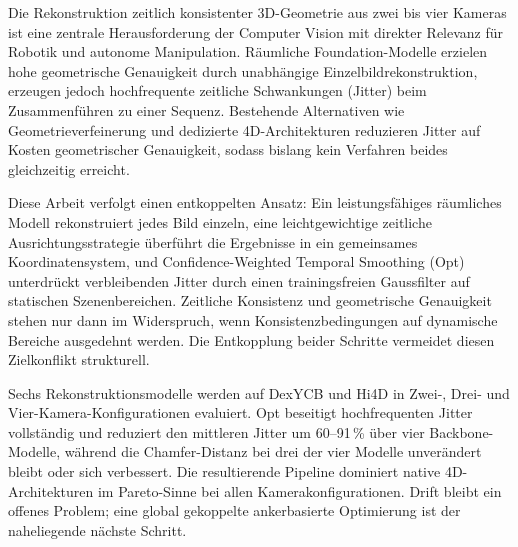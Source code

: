 Die Rekonstruktion zeitlich konsistenter 3D-Geometrie aus zwei bis vier Kameras
ist eine zentrale Herausforderung der Computer Vision mit direkter Relevanz für
Robotik und autonome Manipulation. Räumliche Foundation-Modelle erzielen hohe
geometrische Genauigkeit durch unabhängige Einzelbildrekonstruktion, erzeugen
jedoch hochfrequente zeitliche Schwankungen (Jitter) beim Zusammenführen zu einer
Sequenz. Bestehende Alternativen wie Geometrieverfeinerung und dedizierte
4D-Architekturen reduzieren Jitter auf Kosten geometrischer Genauigkeit, sodass
bislang kein Verfahren beides gleichzeitig erreicht.

Diese Arbeit verfolgt einen entkoppelten Ansatz: Ein leistungsfähiges räumliches
Modell rekonstruiert jedes Bild einzeln, eine leichtgewichtige zeitliche
Ausrichtungsstrategie überführt die Ergebnisse in ein gemeinsames
Koordinatensystem, und Confidence-Weighted Temporal Smoothing (Opt) unterdrückt
verbleibenden Jitter durch einen trainingsfreien Gaussfilter auf statischen
Szenenbereichen. Zeitliche Konsistenz und geometrische Genauigkeit stehen nur
dann im Widerspruch, wenn Konsistenzbedingungen auf dynamische Bereiche
ausgedehnt werden. Die Entkopplung beider Schritte vermeidet diesen Zielkonflikt
strukturell.

Sechs Rekonstruktionsmodelle werden auf DexYCB und
Hi4D in Zwei-, Drei- und Vier-Kamera-Konfigurationen evaluiert. Opt beseitigt
hochfrequenten Jitter vollständig und reduziert den mittleren Jitter um
60--91\,\% über vier Backbone-Modelle, während die Chamfer-Distanz bei drei der
vier Modelle unverändert bleibt oder sich verbessert. Die resultierende Pipeline
dominiert native 4D-Architekturen im Pareto-Sinne bei allen Kamerakonfigurationen.
Drift bleibt ein offenes Problem; eine global gekoppelte ankerbasierte Optimierung
ist der naheliegende nächste Schritt.